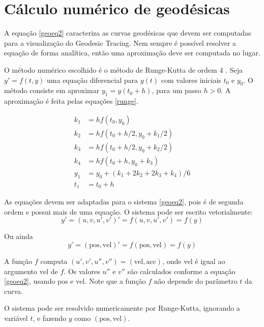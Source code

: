 \chapter{Cálculo numérico de geodésicas}
\label{numeric}

A equação \ref{geoeq2} caracteriza as curvas geodésicas que devem ser 
computadas para a visualização do Geodesic Tracing.
Nem sempre é possível resolver a equação de forma analítica, então uma aproximação
deve ser computada no lugar.

O método numérico escolhido é o método de Runge-Kutta de ordem 4 \cite{Anal:1}.
Seja $y' = f(t, y)$ uma equação diferencial para $y(t)$ com valores iniciais $t_0$ e $y_0$.
O método consiste em aproximar $y_1 = y(t_0+h)$, para um passo $h>0$.
A aproximação é feita pelas equações \ref{runge}.

\begin{equation}
\label{runge}
\begin{split}
k_1 & = hf(t_0, y_0) \\
k_2 & = hf(t_0 + h/2, y_0 + k_1/2) \\
k_3 & = hf(t_0 + h/2, y_0 + k_2/2) \\
k_4 & = hf(t_0 + h, y_0 + k_3) \\
y_1 & = y_0 + (k_1 + 2k_2 + 2k_3 + k_4)/6 \\
t_1 & = t_0 + h
\end{split}
\end{equation}

As equações devem ser adaptadas para o sistema \ref{geoeq2}, pois é de 
segunda ordem e possui mais de uma equação.
O sistema pode ser escrito vetorialmente:
\[y' = (u, v, u', v')' = f(u, v, u', v') = f(y)\]

Ou ainda 
\[y' = (\text{pos}, \text{vel})' = f(\text{pos}, \text{vel}) = f(y)\]

A função $f$ computa $(u', v', u'', v'') = (\text{vel}, \text{acc})$, onde $\text{vel}$ é
igual ao argumento $\text{vel}$ de $f$. Os valores $u''$ e $v''$ são calculados conforme a equação
\ref{geoeq2}, usando $\text{pos}$ e $\text{vel}$.
Note que a função $f$ não depende do parâmetro $t$ da curva.

O sistema pode ser resolvido numericamente por Runge-Kutta, ignorando a variável $t$,
e fazendo $y$ como $(\text{pos}, \text{vel})$.

